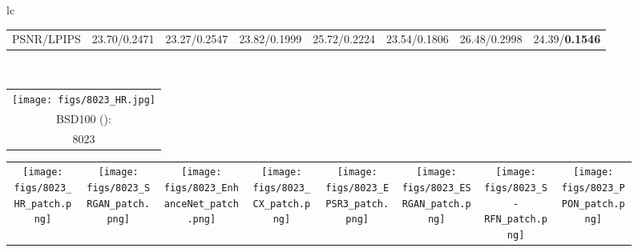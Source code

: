 \documentclass[preprint]{elsarticle}
\begin{document}
\begin{figure*}[htpb]
{\begin{tabular}{lc}
\begin{adjustbox}{valign=t}
\begin{tabular}{cccccccc}
					PSNR/LPIPS & \hspace{-3mm} 23.70/0.2471 & \hspace{-3mm} 23.27/0.2547 & \hspace{-3mm} 23.82/0.1999 & \hspace{-3mm} 25.72/0.2224 & \hspace{-3mm} 23.54/0.1806 & \hspace{-3mm} 26.48/0.2998 & \hspace{-3mm} 24.39/\textbf{0.1546} \\
				\end{tabular}
			\end{adjustbox}
			\\
			
			\begin{adjustbox}{valign=t}
				\scriptsize
				\begin{tabular}{c}
					\texttt{[image: figs/8023\_HR.jpg]} \\
					BSD100 (): \\
					8023 \\
				\end{tabular}
			\end{adjustbox}
			\hspace{-3mm}
			\begin{adjustbox}{valign=t}
				\scriptsize
				\begin{tabular}{cccccccc}
					\texttt{[image: figs/8023\_HR\_patch.png]} &
					\hspace{-3mm}
					\texttt{[image: figs/8023\_SRGAN\_patch.png]} &
					\hspace{-3mm}
					\texttt{[image: figs/8023\_EnhanceNet\_patch.png]} &
					\hspace{-3mm}
					\texttt{[image: figs/8023\_CX\_patch.png]} &
					\hspace{-3mm}
					\texttt{[image: figs/8023\_EPSR3\_patch.png]} &
					\hspace{-3mm}
					\texttt{[image: figs/8023\_ESRGAN\_patch.png]} &
					\hspace{-3mm}
					\texttt{[image: figs/8023\_S-RFN\_patch.png]} &
					\hspace{-3mm}
					\texttt{[image: figs/8023\_PPON\_patch.png]} \\

\end{tabular}
\end{adjustbox}
\end{tabular}}
\end{figure*}
\end{document}
